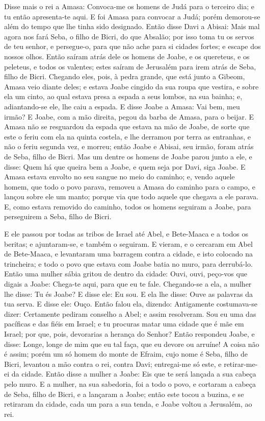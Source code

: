Disse mais o rei a Amasa: Convoca-me os homens de Judá para o
terceiro dia; e tu então apresenta-te aqui. E foi Amasa para
convocar a Judá; porém demorou-se além do tempo que lhe tinha sido
designado. Então disse Davi a Abisai: Mais mal agora nos fará
Seba, o filho de Bicri, do que Absalão; por isso toma tu os servos
de teu senhor, e persegue-o, para que não ache para si cidades
fortes; e escape dos nossos olhos. Então saíram atrás dele os
homens de Joabe, e os quereteus, e os peleteus, e todos os valentes;
estes saíram de Jerusalém para irem atrás de Seba, filho de Bicri.
Chegando eles, pois, à pedra grande, que está junto a Gibeom,
Amasa veio diante deles; e estava Joabe cingido da sua roupa que
vestira, e sobre ela um cinto, ao qual estava presa a espada a seus
lombos, na sua bainha; e, adiantando-se ele, lhe caiu a espada.
E disse Joabe a Amasa: Vai bem, meu irmão? E Joabe, com a mão
direita, pegou da barba de Amasa, para o beijar. E Amasa não
se resguardou da espada que estava na mão de Joabe, de sorte que
este o feriu com ela na quinta costela, e lhe derramou por terra as
entranhas, e não o feriu segunda vez, e morreu; então Joabe e
Abisai, seu irmão, foram atrás de Seba, filho de Bicri. Mas
um dentre os homens de Joabe parou junto a ele, e disse: Quem há que
queira bem a Joabe, e quem seja por Davi, siga Joabe. E Amasa
estava envolto no seu sangue no meio do caminho; e, vendo aquele
homem, que todo o povo parava, removeu a Amasa do caminho para o
campo, e lançou sobre ele um manto; porque via que todo aquele que
chegava a ele parava. E, como estava removido do caminho,
todos os homens seguiram a Joabe, para perseguirem a Seba, filho de
Bicri.

E ele passou por todas as tribos de Israel até Abel, e Bete-Maaca
e a todos os beritas; e ajuntaram-se, e também o seguiram. E
vieram, e o cercaram em Abel de Bete-Maaca, e levantaram uma
barragem contra a cidade, e isto colocado na trincheira; e todo o
povo que estava com Joabe batia no muro, para derrubá-lo.
Então uma mulher sábia gritou de dentro da cidade: Ouvi,
ouvi, peço-vos que digais a Joabe: Chega-te aqui, para que eu te
fale. Chegando-se a ela, a mulher lhe disse: Tu és Joabe? E
disse ele: Eu sou. E ela lhe disse: Ouve as palavras da tua serva. E
disse ele: Ouço. Então falou ela, dizendo: Antigamente
costumava-se dizer: Certamente pediram conselho a Abel; e assim
resolveram. Sou eu uma das pacíficas e das fiéis em Israel; e
tu procuras matar uma cidade que é mãe em Israel; por que, pois,
devorarias a herança do Senhor? Então respondeu Joabe, e
disse: Longe, longe de mim que eu tal faça, que eu devore ou
arruíne! A coisa não é assim; porém um só homem do monte de
Efraim, cujo nome é Seba, filho de Bicri, levantou a mão contra o
rei, contra Davi; entregai-me só este, e retirar-me-ei da cidade.
Então disse a mulher a Joabe: Eis que te será lançada a sua cabeça
pelo muro. E a mulher, na sua sabedoria, foi a todo o povo, e
cortaram a cabeça de Seba, filho de Bicri, e a lançaram a Joabe;
então este tocou a buzina, e se retiraram da cidade, cada um para a
sua tenda, e Joabe voltou a Jerusalém, ao rei.

